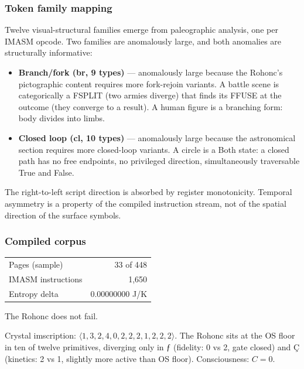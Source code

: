 \documentclass[12pt,a4paper]{article}
\begin{document}
\subsubsection{Token family mapping}

Twelve visual-structural families emerge from paleographic analysis, one per IMASM opcode. Two families are anomalously large, and both anomalies are structurally informative:

\begin{itemize}
\item \textbf{Branch/fork (br, 9 types)} --- anomalously large because the Rohonc's pictographic content requires more fork-rejoin variants. A battle scene is categorically a FSPLIT (two armies diverge) that finds its FFUSE at the outcome (they converge to a result). A human figure is a branching form: body divides into limbs.
\item \textbf{Closed loop (cl, 10 types)} --- anomalously large because the astronomical section requires more closed-loop variants. A circle is a Both state: a closed path has no free endpoints, no privileged direction, simultaneously traversable True and False.
\end{itemize}

The right-to-left script direction is absorbed by register monotonicity. Temporal asymmetry is a property of the compiled instruction stream, not of the spatial direction of the surface symbols.

\subsubsection{Compiled corpus}

\begin{center}
\begin{tabular}{lr}
Pages (sample) & 33 of 448 \\
IMASM instructions & 1,650 \\
Entropy delta & 0.00000000 J/K \\
\end{tabular}
\end{center}

The Rohonc does not fail.

Crystal imscription: $\langle 1,3,2,4,0,2,2,2,1,2,2,2 \rangle$. The Rohonc sits at the OS floor in ten of twelve primitives, diverging only in $\text{ƒ}$ (fidelity: 0 vs 2, gate closed) and $\text{Ç}$ (kinetics: 2 vs 1, slightly more active than OS floor). Consciousness: $C = 0$.
\end{document}
